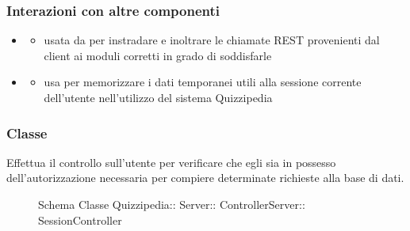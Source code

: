 \subsubsection{Interazioni con altre componenti}
\begin{itemize}
\item {}
\begin{itemize}
\item usata da  per instradare e inoltrare le chiamate REST provenienti dal client ai moduli corretti in grado di soddisfarle
\end{itemize}
\item {}
\begin{itemize}
\item usa  per memorizzare i dati temporanei utili alla sessione corrente dell'utente nell'utilizzo del sistema Quizzipedia
\end{itemize}
\end{itemize}
\subsubsection{Classe }
Effettua il controllo sull'utente per verificare che egli sia in possesso dell'autorizzazione necessaria per compiere determinate richieste alla base di dati.
\begin{figure}[H]
\centering
\noindent{}
\caption[Schema Classe SessionController]{Schema Classe Quizzipedia:: Server:: ControllerServer:: SessionController}
\end{figure}

